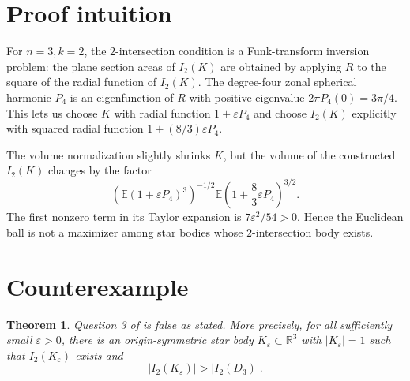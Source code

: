 \documentclass[11pt]{amsart}
\newtheorem{theorem}{Theorem}
\theoremstyle{remark}
\newcommand{\R}{\mathbb R}
\newcommand{\eps}{\varepsilon}
\newcommand{\avg}{\mathbb E}
\begin{document}
\section*{Proof intuition}

For \(n=3,k=2\), the \(2\)-intersection condition is a Funk-transform inversion
problem: the plane section areas of \(I_2(K)\) are obtained by applying \(R\)
to the square of the radial function of \(I_2(K)\).  The degree-four zonal
spherical harmonic \(P_4\) is an eigenfunction of \(R\) with positive
eigenvalue \(2\pi P_4(0)=3\pi/4\).  This lets us choose \(K\) with radial
function \(1+\eps P_4\) and choose \(I_2(K)\) explicitly with squared radial
function \(1+(8/3)\eps P_4\).

The volume normalization slightly shrinks \(K\), but the volume of the
constructed \(I_2(K)\) changes by the factor
\[
        \left(\avg(1+\eps P_4)^3\right)^{-1/2}
        \avg\left(1+\frac83\eps P_4\right)^{3/2}.
\]
The first nonzero term in its Taylor expansion is \(7\eps^2/54>0\).  Hence the
Euclidean ball is not a maximizer among star bodies whose \(2\)-intersection
body exists.

\section*{Counterexample}

\begin{theorem}
Question 3 of \cite{KPZ2011} is false as stated.  More precisely, for all
sufficiently small \(\eps>0\), there is an origin-symmetric star body
\(K_\eps\subset\R^3\) with \(|K_\eps|=1\) such that \(I_2(K_\eps)\) exists and
\[
        |I_2(K_\eps)|>|I_2(D_3)|.
\]
\end{theorem}
\end{document}
